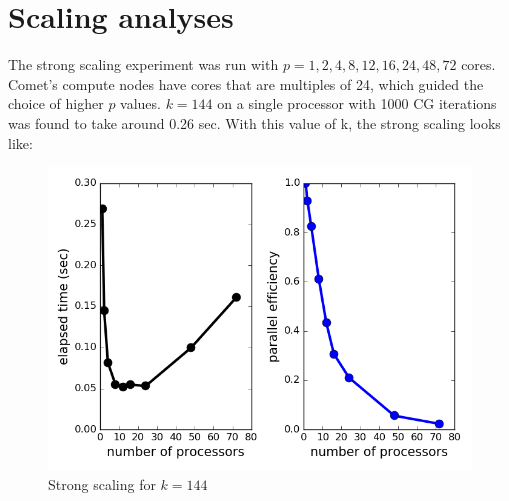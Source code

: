 \documentclass[12pt,letterpaper]{article}
\begin{document}
\section*{Scaling analyses}
\noindent The strong scaling experiment was run with $p = 1, 2, 4, 8, 12, 16, 24, 48, 72$ cores. Comet's compute nodes have cores that are multiples of 24, which guided the choice of higher $p$ values. $k = 144$ on a single processor with 1000 CG iterations was found to take around 0.26 sec. With this value of k, the strong scaling looks like:
%
\begin{figure}[h]
\centering
\includegraphics[scale = 0.7]{strongscale.png}
\caption{Strong scaling for $ k = 144$}
\end{figure}
\end{document}

